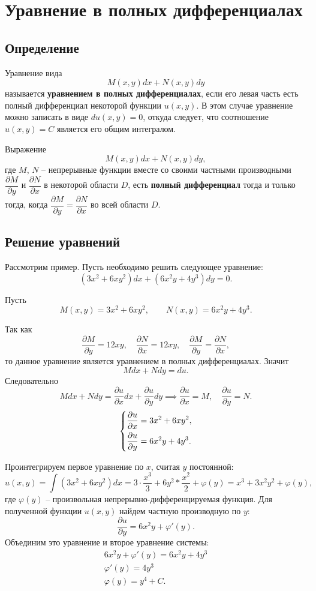 \documentclass[a5paper, 11pt]{extbook}
\theoremstyle{definition}
\theoremstyle{definition}
\begin{document}
\section{Уравнение в полных дифференциалах}

\subsection{Определение}

Уравнение вида
\[
    M(x, y) dx + N(x, y)dy
\]
называется \textbf{уравнением в полных дифференциалах}, если его левая часть есть полный дифференциал некоторой функции \(u(x, y)\). В этом случае уравнение можно записать в виде \(du(x, y) = 0\), откуда следует, что соотношение \(u(x, y) = C\) является его общим интегралом.

Выражение
\[
    M(x, y)dx + N(x, y)dy,
\]
где \(M\), \(N\) -- непрерывные функции вместе со своими частными производными \(\dfrac{\partial M}{\partial y}\) и \(\dfrac{\partial N}{\partial x}\) в некоторой области \(D\), есть \textbf{полный дифференциал} тогда и только тогда, когда \(\dfrac{\partial M}{\partial y} = \dfrac{\partial N}{\partial x}\) во всей области \(D\).

\subsection{Решение уравнений}

Рассмотрим пример. Пусть необходимо решить следующее уравнение:
\[
    (3x^2 + 6xy^2) dx + (6x^2y + 4y^3) dy = 0.
\]

Пусть
\[
    M(x, y) = 3x^2 + 6xy^2,
    \qquad
    N(x, y) = 6x^2y + 4y^3.
\]

Так как
\[
    \frac{\partial M}{\partial y} = 12xy,
    \quad
    \frac{\partial N}{\partial x} = 12xy,
    \quad
    \frac{\partial M}{\partial y} = \frac{\partial N}{\partial x},
\]
то данное уравнение является уравнением в полных дифференциалах. Значит
\[
    Mdx + Ndy = du.
\]
Следовательно
\[
    Mdx + Ndy = \frac{\partial u}{\partial x} dx + \frac{\partial u}{\partial y}dy
    \implies
    \frac{\partial u}{\partial x} = M,
    \quad
    \frac{\partial u}{\partial y} = N.
\]
\[
    \begin{dcases}
        \frac{\partial u}{\partial x} = 3x^2 + 6xy^2, \\
        \frac{\partial u}{\partial y} = 6x^2y + 4y^3.
    \end{dcases}
\]

Проинтегрируем первое уравнение по \(x\), считая \(y\) постоянной:
\[
    u(x, y) =
    \int (3x^2 + 6xy^2)dx =
    3 \cdot \frac{x^3}{3} + 6y^2 * \frac{x^2}{2} + \varphi(y) =
    x^3 + 3x^2y^2 + \varphi(y),
\]
где \(\varphi(y)\) -- произвольная непрерывно-дифференцируемая функция. Для полученной функции \(u(x, y)\) найдем частную производную по \(y\):
\[
    \frac{\partial u}{\partial y} = 6x^2y + \varphi'(y).
\]
Объединим это уравнение и второе уравнение системы:
\begin{gather*}
    6x^2y + \varphi'(y) = 6x^2y + 4y^3 \\
    \varphi'(y) = 4y^3 \\
    \varphi(y) = y^4 + C.
\end{gather*}
\end{document}
